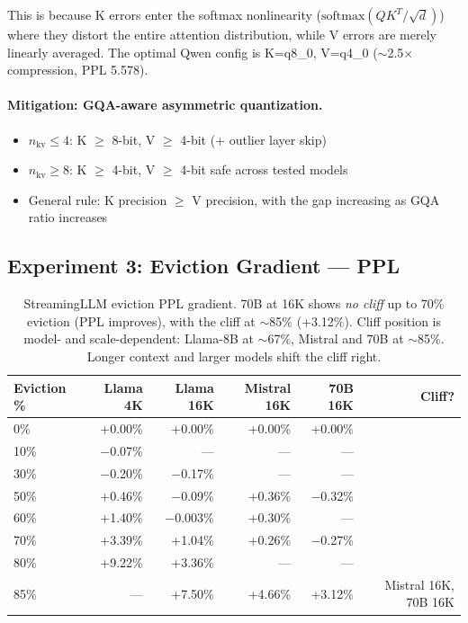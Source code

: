 \noindent This is because K errors enter the softmax nonlinearity ($\text{softmax}(QK^T/\sqrt{d})$) where they distort the entire attention distribution, while V errors are merely linearly averaged. The optimal Qwen config is K=q8\_0, V=q4\_0 ($\sim$2.5$\times$ compression, PPL 5.578).

\paragraph{Mitigation: GQA-aware asymmetric quantization.}
\begin{itemize}
    \item $n_\text{kv} \leq 4$: K $\geq$ 8-bit, V $\geq$ 4-bit (+ outlier layer skip)
    \item $n_\text{kv} \geq 8$: K $\geq$ 4-bit, V $\geq$ 4-bit safe across tested models
    \item General rule: K precision $\geq$ V precision, with the gap increasing as GQA ratio increases
\end{itemize}

\subsection{Experiment 3: Eviction Gradient --- PPL}
\label{sec:exp-eviction-ppl}

\begin{table}[h]
\centering
\begin{tabular}{lrrrrr}
\toprule
\textbf{Eviction \%} & \textbf{Llama 4K} & \textbf{Llama 16K} & \textbf{Mistral 16K} & \textbf{70B 16K} & \textbf{Cliff?} \\
\midrule
0\%  & +0.00\% & +0.00\%  & +0.00\%  & +0.00\%  & \\
10\% &$-$0.07\%& ---      & ---      & ---      & \\
30\% &$-$0.20\%&$-$0.17\% & ---      & ---      & \\
50\% & +0.46\% &$-$0.09\% & +0.36\%  & $-$0.32\%& \\
60\% & +1.40\% &$-$0.003\%& +0.30\%  & ---      & \\
70\% & +3.39\% & +1.04\%  & +0.26\%  & $-$0.27\%& \\
80\% & +9.22\% & +3.36\%  & ---      & ---      & \\
85\% & ---     & +7.50\%  & +4.66\%  & +3.12\%  & Mistral 16K, 70B 16K \\
\bottomrule
\end{tabular}
\caption{StreamingLLM eviction PPL gradient. 70B at 16K shows \emph{no cliff} up to 70\% eviction (PPL improves), with the cliff at $\sim$85\% (+3.12\%). Cliff position is model- and scale-dependent: Llama-8B at $\sim$67\%, Mistral and 70B at $\sim$85\%. Longer context and larger models shift the cliff right.}
\label{tab:eviction-gradient}
\end{table}

